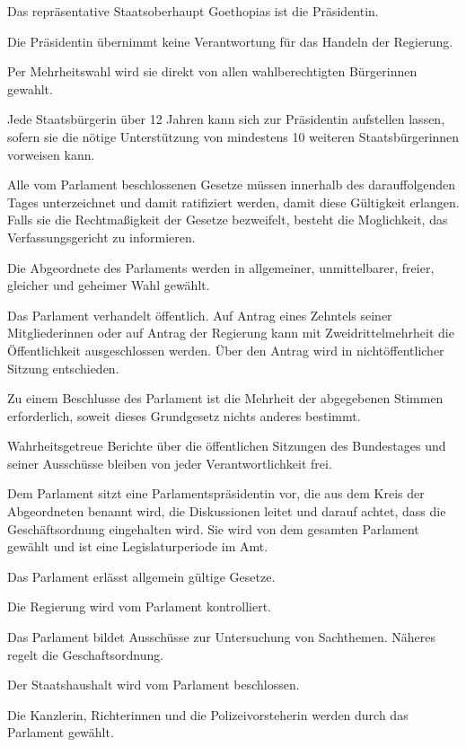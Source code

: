 \documentclass{sasbase}
\begin{document}
\begin{article}[Präsidentin]
	\item Das repräsentative Staatsoberhaupt Goethopias ist die Präsidentin.
	\item Die Präsidentin übernimmt keine Verantwortung für das Handeln der Regierung.
	\item Per Mehrheitswahl wird sie direkt von allen wahlberechtigten Bürgerinnen gewahlt.
	\item Jede Staatsbürgerin über 12 Jahren kann sich zur Präsidentin aufstellen lassen, sofern sie die nötige Unterstützung von mindestens 10 weiteren Staatsbürgerinnen vorweisen kann.
	\item Alle vom Parlament beschlossenen Gesetze müssen innerhalb des darauffolgenden Tages unterzeichnet und damit ratifiziert werden, damit diese Gültigkeit erlangen. Falls sie die Rechtmaßigkeit der Gesetze bezweifelt, besteht die Moglichkeit, das Verfassungsgericht zu informieren.
\end{article}


\begin{article}
	\item Die Abgeordnete des Parlaments werden in allgemeiner, unmittelbarer, freier, gleicher und geheimer Wahl gewählt.
	\item Das Parlament verhandelt öffentlich. Auf Antrag eines Zehntels seiner Mitgliederinnen oder auf Antrag der Regierung kann mit Zweidrittelmehrheit die Öffentlichkeit ausgeschlossen werden. Über den Antrag wird in nichtöffentlicher Sitzung entschieden.
	\item Zu einem Beschlusse des Parlament ist die Mehrheit der abgegebenen Stimmen erforderlich, soweit dieses Grundgesetz nichts anderes bestimmt.
	\item Wahrheitsgetreue Berichte über die öffentlichen Sitzungen des Bundestages und seiner Ausschüsse bleiben von jeder Verantwortlichkeit frei.
	\item Dem Parlament sitzt eine Parlamentspräsidentin vor, die aus dem Kreis der Abgeordneten benannt wird, die Diskussionen leitet und darauf achtet, dass die Geschäftsordnung eingehalten wird. Sie wird von dem gesamten Parlament gewählt und ist eine Legislaturperiode im Amt.\end{article}

\begin{article}
	\item Das Parlament erlässt allgemein gültige Gesetze.
	\item Die Regierung wird vom Parlament kontrolliert.
	\item Das Parlament bildet Ausschüsse zur Untersuchung von Sachthemen. Näheres regelt die Geschaftsordnung.
	\item Der Staatshaushalt wird vom Parlament beschlossen.
	\item Die Kanzlerin, Richterinnen und die Polizeivorsteherin werden durch das Parlament gewählt.
\end{article}
\end{document}
